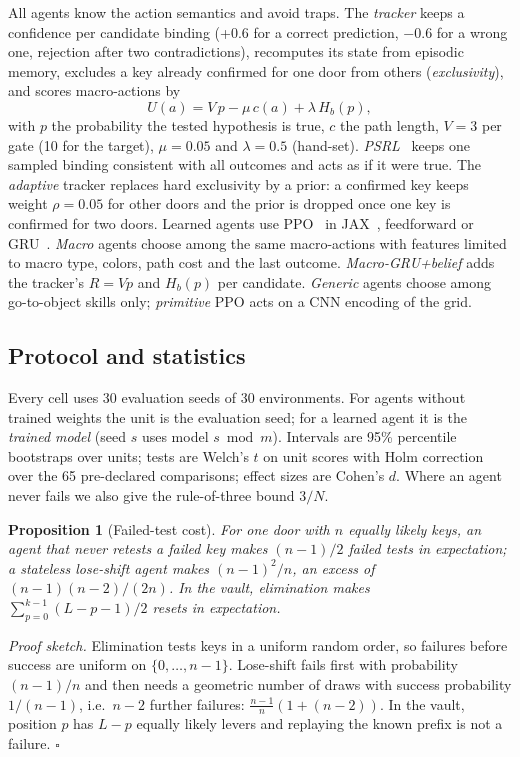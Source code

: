 \documentclass[conference]{IEEEtran}
\newtheorem{proposition}{Proposition}
\begin{document}
All agents know the action semantics and avoid traps. The \emph{tracker} keeps a confidence per candidate binding (+0.6 for a correct prediction, $-0.6$ for a wrong one, rejection after two contradictions), recomputes its state from episodic memory, excludes a key already confirmed for one door from others (\emph{exclusivity}), and scores macro-actions by
\begin{equation}
U(a)=V\,p-\mu\,c(a)+\lambda\,H_b(p),\label{eq:u}
\end{equation}
with $p$ the probability the tested hypothesis is true, $c$ the path length, $V=3$ per gate (10 for the target), $\mu=0.05$ and $\lambda=0.5$ (hand-set). \emph{PSRL}~\cite{strens2000,osband2013} keeps one sampled binding consistent with all outcomes and acts as if it were true. The \emph{adaptive} tracker replaces hard exclusivity by a prior: a confirmed key keeps weight $\rho=0.05$ for other doors and the prior is dropped once one key is confirmed for two doors. Learned agents use PPO~\cite{schulman2017} in JAX~\cite{jax2018}, feedforward or GRU~\cite{cho2014}. \emph{Macro} agents choose among the same macro-actions with features limited to macro type, colors, path cost and the last outcome. \emph{Macro-GRU+belief} adds the tracker's $R=Vp$ and $H_b(p)$ per candidate. \emph{Generic} agents choose among go-to-object skills only; \emph{primitive} PPO acts on a CNN encoding of the grid.

\subsection{Protocol and statistics}
Every cell uses 30 evaluation seeds of 30 environments. For agents without trained weights the unit is the evaluation seed; for a learned agent it is the \emph{trained model} (seed $s$ uses model $s \bmod m$). Intervals are 95\% percentile bootstraps over units; tests are Welch's $t$ on unit scores with Holm correction~\cite{holm1979} over the 65 pre-declared comparisons; effect sizes are Cohen's $d$. Where an agent never fails we also give the rule-of-three bound $3/N$.
\begin{proposition}[Failed-test cost]\label{prop:cost}
For one door with $n$ equally likely keys, an agent that never retests a failed key makes $(n-1)/2$ failed tests in expectation; a stateless lose-shift agent makes $(n-1)^2/n$, an excess of $(n-1)(n-2)/(2n)$. In the vault, elimination makes $\sum_{p=0}^{k-1}(L-p-1)/2$ resets in expectation.
\end{proposition}
\emph{Proof sketch.} Elimination tests keys in a uniform random order, so failures before success are uniform on $\{0,\dots,n-1\}$. Lose-shift fails first with probability $(n-1)/n$ and then needs a geometric number of draws with success probability $1/(n-1)$, i.e.\ $n-2$ further failures: $\tfrac{n-1}{n}(1+(n-2))$. In the vault, position $p$ has $L-p$ equally likely levers and replaying the known prefix is not a failure. \hfill$\square$
\end{document}
